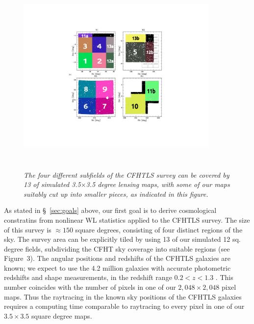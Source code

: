 \documentclass[10pt, preprint]{aastex}
\begin{document}
\begin{figure}[t!]
\label{fig:cfht}
\begin{center}
\includegraphics[height=10cm, width=10cm]{CFHTjia.pdf}
\vspace{-4\baselineskip}\caption{\it The four different subfields of
  the CFHTLS survey can be covered by 13 of simulated 3.5$\times$3.5
  degree lensing maps, with some of our maps suitably cut up into
  smaller pieces, as indicated in this figure.}
\end{center}
\end{figure}

As stated in \S~\ref{sec:goals} above, our first goal is to derive
cosmological constratins from nonlinear WL statistics applied to the
CFHTLS survey.  The size of this survey is $\approx 150$ square
degrees, consisting of four distinct regions of the sky.  The survey
area can be explicitly tiled by using 13 of our simulated 12
sq. degree fields, subdividing the CFHT sky coverage into suitable
regions (see Figure~3).  The angular positions and redshifts of the
CFHTLS galaxies are known; we expect to use the 4.2 million galaxies
with accurate photometric redshifts and shape measurements, in the
redshift range $0.2 < z < 1.3$ \citep{Kilbinger2013}.  This number
coincides with the number of pixels in one of our $2,048\times2,048$
pixel maps. Thus the raytracing in the known sky positions of the
CFHTLS galaxies requires a computing time comparable to raytracing to
every pixel in one of our $3.5\times 3.5$ square degree maps.
\end{document}
